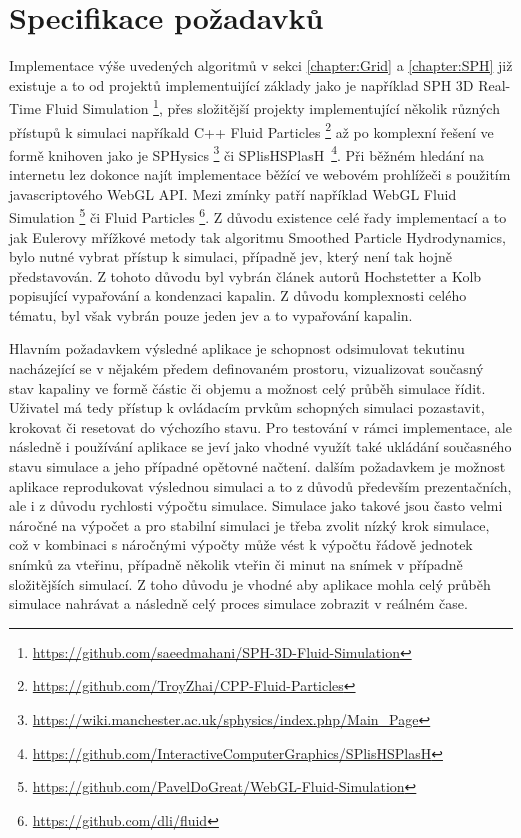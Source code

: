 \section{Specifikace požadavků}
\label{chapter:spec}
Implementace výše uvedených algoritmů v sekci \ref{chapter:Grid} a \ref{chapter:SPH} již existuje a to od projektů implementuijící základy jako je například SPH 3D Real-Time Fluid Simulation \footnote{\url{https://github.com/saeedmahani/SPH-3D-Fluid-Simulation}}, přes složitější projekty implementující několik různých přístupů k simulaci napříkald C++ Fluid Particles \footnote{\url{https://github.com/TroyZhai/CPP-Fluid-Particles}} až po komplexní řešení ve formě knihoven jako je SPHysics \footnote{\url{https://wiki.manchester.ac.uk/sphysics/index.php/Main_Page}} či SPlisHSPlasH~\footnote{\url{https://github.com/InteractiveComputerGraphics/SPlisHSPlasH}}. Při běžném hledání na internetu lez dokonce najít implementace běžící ve webovém prohlížeči s použitím javascriptového WebGL API. Mezi zmínky patří například WebGL Fluid Simulation \footnote{\url{https://github.com/PavelDoGreat/WebGL-Fluid-Simulation}} či Fluid Particles \footnote{\url{https://github.com/dli/fluid}}. Z důvodu existence celé řady implementací a to jak Eulerovy mřížkové metody tak algoritmu Smoothed Particle Hydrodynamics, bylo nutné vybrat přístup k simulaci, případně jev, který není tak hojně představován. Z tohoto důvodu byl vybrán článek autorů Hochstetter a Kolb popisující vypařování a kondenzaci kapalin. Z důvodu komplexnosti celého tématu, byl však vybrán pouze jeden jev a to vypařování kapalin.

Hlavním požadavkem výsledné aplikace je schopnost odsimulovat tekutinu nacházející se v nějakém předem definovaném prostoru, vizualizovat současný stav kapaliny ve formě částic či objemu a možnost celý průběh simulace řídit. Uživatel má tedy přístup k ovládacím prvkům schopných simulaci pozastavit, krokovat či resetovat do výchozího stavu. Pro testování v rámci implementace, ale následně i používání aplikace se jeví jako vhodné využít také ukládání současného stavu simulace a jeho případné opětovné načtení. dalším požadavkem je možnost aplikace reprodukovat výslednou simulaci a to z důvodů především prezentačních, ale i z důvodu rychlosti výpočtu simulace. Simulace jako takové jsou často velmi náročné na výpočet a pro stabilní simulaci je třeba zvolit nízký krok simulace, což v kombinaci s náročnými výpočty může vést k výpočtu řádově jednotek snímků za vteřinu, případně několik vteřin či minut na snímek v případně složitějších simulací. Z toho důvodu je vhodné aby aplikace mohla celý průběh simulace nahrávat a následně celý proces simulace zobrazit v reálném čase. 

